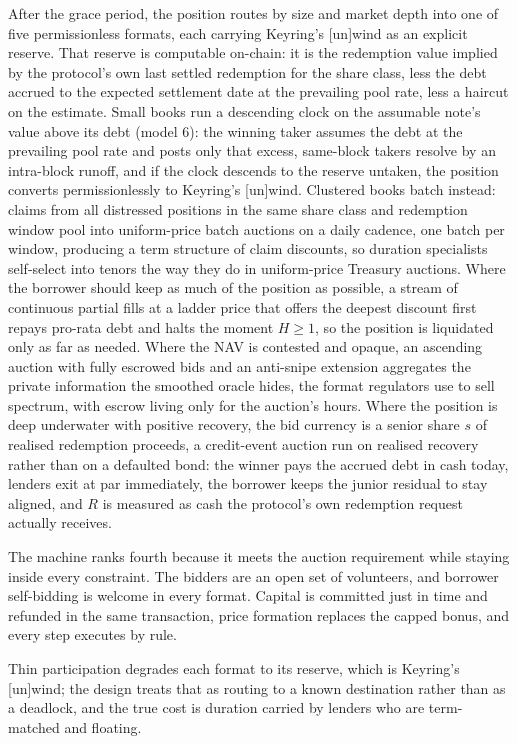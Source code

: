 \documentclass[11pt,a4paper]{article}
\begin{document}
After the grace period, the position routes by size and market depth into one of five permissionless formats, each carrying Keyring's [un]wind as an explicit reserve. That reserve is computable on-chain: it is the redemption value implied by the protocol's own last settled redemption for the share class, less the debt accrued to the expected settlement date at the prevailing pool rate, less a haircut on the estimate. Small books run a descending clock on the assumable note's value above its debt (model 6): the winning taker assumes the debt at the prevailing pool rate and posts only that excess, same-block takers resolve by an intra-block runoff, and if the clock descends to the reserve untaken, the position converts permissionlessly to Keyring's [un]wind. Clustered books batch instead: claims from all distressed positions in the same share class and redemption window pool into uniform-price batch auctions on a daily cadence, one batch per window, producing a term structure of claim discounts, so duration specialists self-select into tenors the way they do in uniform-price Treasury auctions. Where the borrower should keep as much of the position as possible, a stream of continuous partial fills at a ladder price that offers the deepest discount first repays pro-rata debt and halts the moment $H \ge 1$, so the position is liquidated only as far as needed. Where the NAV is contested and opaque, an ascending auction with fully escrowed bids and an anti-snipe extension aggregates the private information the smoothed oracle hides, the format regulators use to sell spectrum, with escrow living only for the auction's hours. Where the position is deep underwater with positive recovery, the bid currency is a senior share $s$ of realised redemption proceeds, a credit-event auction run on realised recovery rather than on a defaulted bond: the winner pays the accrued debt in cash today, lenders exit at par immediately, the borrower keeps the junior residual to stay aligned, and $R$ is measured as cash the protocol's own redemption request actually receives.

The machine ranks fourth because it meets the auction requirement while staying inside every constraint. The bidders are an open set of volunteers, and borrower self-bidding is welcome in every format. Capital is committed just in time and refunded in the same transaction, price formation replaces the capped bonus, and every step executes by rule.

Thin participation degrades each format to its reserve, which is Keyring's [un]wind; the design treats that as routing to a known destination rather than as a deadlock, and the true cost is duration carried by lenders who are term-matched and floating.
\end{document}
